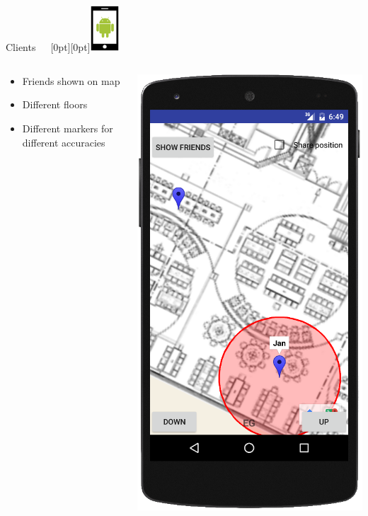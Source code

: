 \documentclass[11pt]{beamer}
\begin{document}
\begin{frame}{Clients~~~\raisebox{-10pt}[0pt][0pt]{\includegraphics[width=0.08\textwidth]{tech-stack-android}}}

\begin{columns}[T]
	\begin{column}{.6\textwidth}
	\begin{itemize}
		\item Friends shown on map
		\item Different floors
		\item Different markers for different accuracies
	\end{itemize}
	\end{column}
	\begin{column}{.4\textwidth}
	\includegraphics[scale=0.27]{android_show_friends}

\end{column}
\end{columns}
\end{frame}
\end{document}
